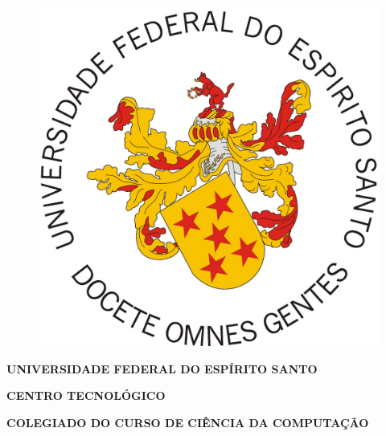 \documentclass[
	12pt,				%
	openright,			%
	oneside,			%
	a4paper,			%
	english,			%
	french,				%
	spanish,			%
	brazil				%
	]{abntex2}
\begin{document}
\begin{figure}
	\centering
	\includegraphics[width=.20\textwidth]{figuras/brasao.jpg} 
	\label{fig-brasao}
\end{figure}

\begin{center}
	\textbf{\textsf{UNIVERSIDADE FEDERAL DO ESPÍRITO SANTO}}
	
	\textbf{\textsf{CENTRO TECNOLÓGICO}}
	
	\textbf{\textsf{COLEGIADO DO CURSO DE CIÊNCIA DA COMPUTAÇÃO}}
	
	\large{\textbf{\textsf{  }}}
	
	\large{\textbf{\textsf{  }}}
\end{center}

\frenchspacing

\imprimircapa

\imprimirfolhaderosto*



%     
\end{document}
